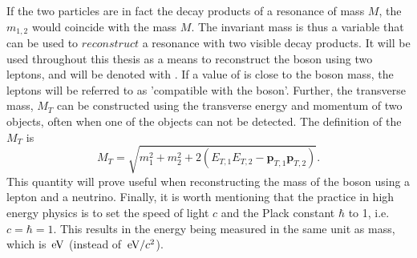 If the two particles  are in fact the decay products of a resonance of mass $M$, the $m_{1,2}$ would coincide with the mass $M$. 
The invariant mass is thus a variable that can be used to $reconstruct$ a resonance with two visible decay products. 
It will be used throughout this thesis as a means to reconstruct the \PZ boson using two leptons, and will be denoted with \mll. 
If a  value of \mll is close to the \PZ boson mass, the leptons will be referred to as 'compatible with the \PZ boson'.  
\newpara
\noindent\justify
Further, the transverse mass, $M_{T}$ can be constructed using the transverse energy and momentum of two objects, often when one of the objects can not be detected. 
The definition of the $M_{T}$ is 
\begin{equation}
M_{T}=\sqrt{m_{1}^{2}+m_{2}^{2}+2(E_{T,1}E_{T,2}-\mathbf{p}_{T,1}\mathbf{p}_{T,2})}.
\end{equation}
This quantity will prove useful when reconstructing the mass of the \PW boson using a lepton and a neutrino.                        
\newpara
\noindent\justify
Finally, it is worth mentioning that the practice in high energy physics is to set the speed of light $c$ and the Plack constant $\hbar$ to 1, i.e. $c=\hbar=1$. 
This results in the energy being measured in the same unit as mass, which is $\,\text{e\hspace{-.08em}V}$ (instead of $\,\text{e\hspace{-.08em}V}/c^{2}$).  
